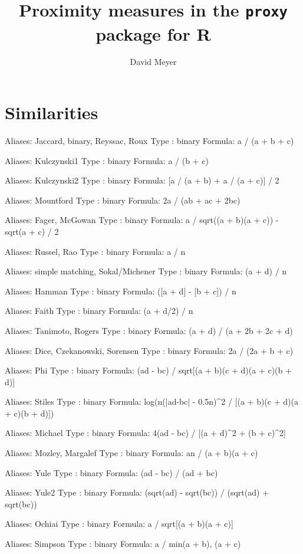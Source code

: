 \documentclass{article}
\title{Proximity measures in the \texttt{proxy} package for {\sf R}}
\author{David Meyer}
\begin{document}

\maketitle
\section{Similarities}
\begin{Schunk}
\begin{Soutput}
Aliases: Jaccard, binary, Reyssac, Roux
Type   : binary
Formula: a / (a + b + c)

Aliases: Kulczynski1
Type   : binary
Formula: a / (b + c)

Aliases: Kulczynski2
Type   : binary
Formula: [a / (a + b) + a / (a + c)] / 2

Aliases: Mountford
Type   : binary
Formula: 2a / (ab + ac + 2bc)

Aliases: Fager, McGowan
Type   : binary
Formula: a / sqrt((a + b)(a + c)) - sqrt(a + c) / 2

Aliases: Russel, Rao
Type   : binary
Formula: a / n

Aliases: simple matching, Sokal/Michener
Type   : binary
Formula: (a + d) / n

Aliases: Hamman
Type   : binary
Formula: ([a + d] - [b + c]) / n

Aliases: Faith
Type   : binary
Formula: (a + d/2) / n

Aliases: Tanimoto, Rogers
Type   : binary
Formula: (a + d) / (a + 2b + 2c + d)

Aliases: Dice, Czekanowski, Sorensen
Type   : binary
Formula: 2a / (2a + b + c)

Aliases: Phi
Type   : binary
Formula: (ad - bc) / sqrt[(a + b)(c + d)(a + c)(b + d)]

Aliases: Stiles
Type   : binary
Formula: log(n(|ad-bc| - 0.5n)^2 / [(a + b)(c + d)(a + c)(b + d)])

Aliases: Michael
Type   : binary
Formula: 4(ad - bc) / [(a + d)^2 + (b + c)^2]

Aliases: Mozley, Margalef
Type   : binary
Formula: an / (a + b)(a + c)

Aliases: Yule
Type   : binary
Formula: (ad - bc) / (ad + bc)

Aliases: Yule2
Type   : binary
Formula: (sqrt(ad) - sqrt(bc)) / (sqrt(ad) + sqrt(bc))

Aliases: Ochiai
Type   : binary
Formula: a / sqrt[(a + b)(a + c)]

Aliases: Simpson
Type   : binary
Formula: a / min{(a + b), (a + c)}


\end{Soutput}
\end{Schunk}
\end{document}
